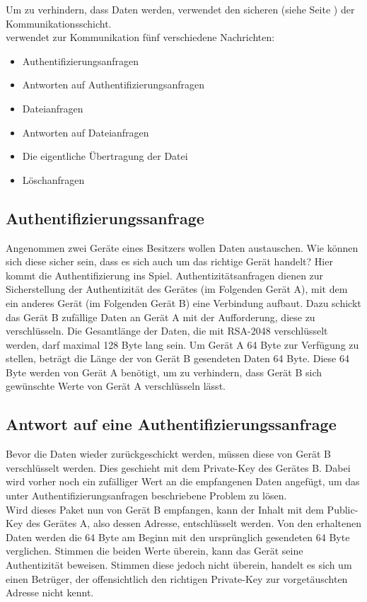Um zu verhindern, dass Daten werden, verwendet \sblit den sicheren  (siehe Seite \pageref{Applicationchannel}) der Kommunikationsschicht.\\
\sblitg verwendet zur Kommunikation fünf verschiedene Nachrichten:
\begin{itemize}
	\item Authentifizierungsanfragen
	\item Antworten auf Authentifizierungsanfragen
	\item Dateianfragen
	\item Antworten auf Dateianfragen
	\item Die eigentliche Übertragung der Datei
	\item Löschanfragen
\end{itemize}
\subsection{Authentifizierungssanfrage}
Angenommen zwei Geräte eines Besitzers wollen Daten austauschen. Wie können sich diese sicher sein, dass es sich auch um das richtige Gerät handelt? Hier kommt die Authentifizierung ins Spiel. Authentizitätsanfragen dienen zur Sicherstellung der Authentizität des Gerätes (im Folgenden Gerät A), mit dem ein anderes Gerät (im Folgenden Gerät B) eine Verbindung aufbaut. Dazu schickt das Gerät B zufällige Daten an Gerät A mit der Aufforderung, diese zu verschlüsseln. Die Gesamtlänge der Daten, die mit RSA-2048 verschlüsselt werden, darf maximal 128 Byte lang sein. Um Gerät A 64 Byte zur Verfügung zu stellen, beträgt die Länge der von Gerät B gesendeten Daten 64 Byte. Diese 64 Byte werden von Gerät A benötigt, um zu verhindern, dass Gerät B sich gewünschte Werte von Gerät A verschlüsseln lässt.

\subsection{Antwort auf eine Authentifizierungssanfrage}
Bevor die Daten wieder zurückgeschickt werden, müssen diese von Gerät B verschlüsselt werden. Dies geschieht mit dem Private-Key des Gerätes B. Dabei wird vorher noch ein zufälliger Wert an die empfangenen Daten angefügt, um das unter Authentifizierungsanfragen beschriebene Problem zu lösen.\\
Wird dieses Paket nun von Gerät B empfangen, kann der Inhalt mit dem Public-Key des Gerätes A, also dessen Adresse, entschlüsselt werden. Von den erhaltenen Daten werden die 64 Byte am Beginn mit den ursprünglich gesendeten 64 Byte verglichen. Stimmen die beiden Werte überein, kann das Gerät seine Authentizität beweisen. Stimmen diese jedoch nicht überein, handelt es sich um einen Betrüger, der offensichtlich den richtigen Private-Key zur vorgetäuschten Adresse nicht kennt.
		
